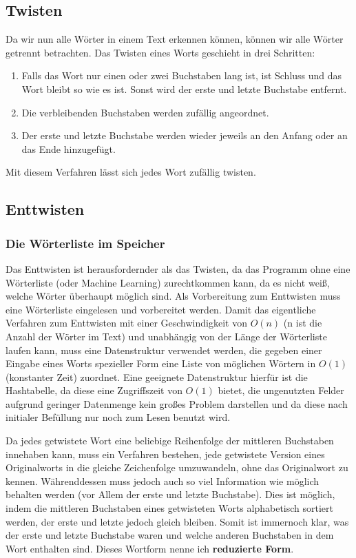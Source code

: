 \documentclass[a4paper,10pt,ngerman]{scrartcl}
\begin{document}
\subsection{Twisten}
Da wir nun alle Wörter in einem Text erkennen können, können wir alle Wörter getrennt betrachten. Das Twisten eines Worts geschieht in drei Schritten:
\begin{enumerate}
  \item Falls das Wort nur einen oder zwei Buchstaben lang ist, ist Schluss und das Wort bleibt so wie es ist. Sonst wird der erste und letzte Buchstabe entfernt. 
  \item Die verbleibenden Buchstaben werden zufällig angeordnet.
  \item Der erste und letzte Buchstabe werden wieder jeweils an den Anfang oder an das Ende hinzugefügt.
\end{enumerate}
Mit diesem Verfahren lässt sich jedes Wort zufällig twisten.

\subsection{Enttwisten}

\subsubsection{Die Wörterliste im Speicher}
Das Enttwisten ist herausfordernder als das Twisten, da das Programm ohne eine Wörterliste (oder Machine Learning) zurechtkommen kann, da es nicht weiß, welche Wörter überhaupt möglich sind. Als Vorbereitung zum Enttwisten muss eine Wörterliste eingelesen und vorbereitet werden. Damit das eigentliche Verfahren zum Enttwisten mit einer Geschwindigkeit von $O(n)$ (n ist die Anzahl der Wörter im Text) und unabhängig von der Länge der Wörterliste laufen kann, muss eine Datenstruktur verwendet werden, die gegeben einer Eingabe eines Worts spezieller Form eine Liste von möglichen Wörtern in $O(1)$ (konstanter Zeit) zuordnet. Eine geeignete Datenstruktur hierfür ist die Hashtabelle, da diese eine Zugriffszeit von $O(1)$ bietet, die ungenutzten Felder aufgrund geringer Datenmenge kein großes Problem darstellen und da diese nach initialer Befüllung nur noch zum Lesen benutzt wird. 

Da jedes getwistete Wort eine beliebige Reihenfolge der mittleren Buchstaben innehaben kann, muss ein Verfahren bestehen, jede getwistete Version eines Originalworts in die gleiche Zeichenfolge umzuwandeln, ohne das Originalwort zu kennen. Währenddessen muss jedoch auch so viel Information wie möglich behalten werden (vor Allem der erste und letzte Buchstabe). Dies ist möglich, indem die mittleren Buchstaben eines getwisteten Worts alphabetisch sortiert werden, der erste und letzte jedoch gleich bleiben. Somit ist immernoch klar, was der erste und letzte Buchstabe waren und welche anderen Buchstaben in dem Wort enthalten sind. Dieses Wortform nenne ich \textbf{reduzierte Form}.
\end{document}
